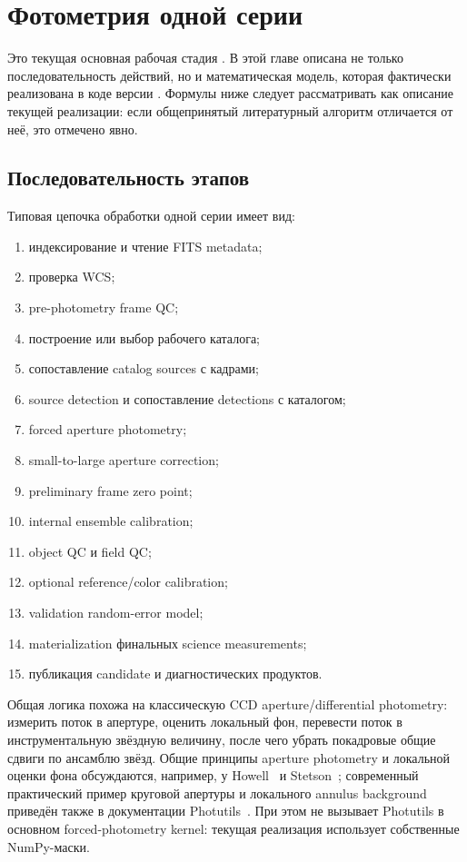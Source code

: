 \chapter{Фотометрия одной серии}
\label{chap:series-photometry}

Это текущая основная рабочая стадия \program{}. В этой главе описана не только последовательность действий, но и математическая модель, которая фактически реализована в коде версии \manualversion. Формулы ниже следует рассматривать как описание текущей реализации: если общепринятый литературный алгоритм отличается от неё, это отмечено явно.

\section{Последовательность этапов}

Типовая цепочка обработки одной серии имеет вид:

\begin{enumerate}
  \item индексирование и чтение FITS metadata;
  \item проверка WCS;
  \item pre-photometry frame QC;
  \item построение или выбор рабочего каталога;
  \item сопоставление catalog sources с кадрами;
  \item source detection и сопоставление detections с каталогом;
  \item forced aperture photometry;
  \item small-to-large aperture correction;
  \item preliminary frame zero point;
  \item internal ensemble calibration;
  \item object QC и field QC;
  \item optional reference/color calibration;
  \item validation random-error model;
  \item materialization финальных science measurements;
  \item публикация candidate и диагностических продуктов.
\end{enumerate}

Общая логика похожа на классическую CCD aperture/differential photometry: измерить поток в апертуре, оценить локальный фон, перевести поток в инструментальную звёздную величину, после чего убрать покадровые общие сдвиги по ансамблю звёзд. Общие принципы aperture photometry и локальной оценки фона обсуждаются, например, у Howell~\cite{howell1989} и Stetson~\cite{stetson1987}; современный практический пример круговой апертуры и локального annulus background приведён также в документации Photutils~\cite{photutils_aperture}. При этом \program{} не вызывает Photutils в основном forced-photometry kernel: текущая реализация использует собственные NumPy-маски.


